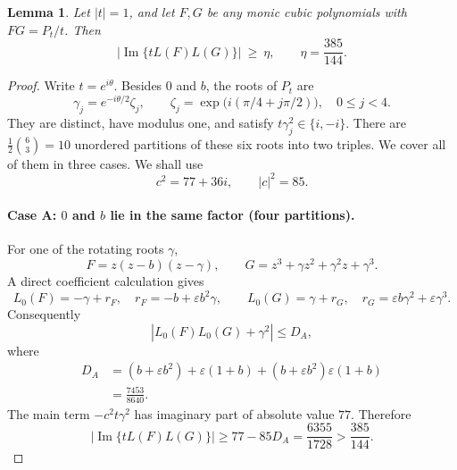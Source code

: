 \documentclass[11pt]{article}
\newtheorem{lemma}[theorem]{Lemma}
\theoremstyle{remark}\newtheorem{remark}[theorem]{Remark}
\newcommand{\im}{\operatorname{Im}}\newcommand{\re}{\operatorname{Re}}
\begin{document}
\begin{lemma}\label{lem:factor}
Let $|t|=1$, and let $F,G$ be any monic cubic polynomials with $FG=P_t/t$. Then
\begin{equation}\label{eq:margin}
 \bigl|\im\{tL(F)L(G)\}\bigr|\ \ge\ \eta,
 \qquad \eta=\frac{385}{144}.
\end{equation}
\end{lemma}
\begin{proof}
Write $t=e^{i\theta}$. Besides $0$ and $b$, the roots of $P_t$ are
\[
 \gamma_j=e^{-i\theta/2}\zeta_j,
 \qquad \zeta_j=\exp\bigl(i(\pi/4+j\pi/2)\bigr),\quad 0\le j<4.
\]
They are distinct, have modulus one, and satisfy $t\gamma_j^2\in\{i,-i\}$. There are $\frac12\binom63=10$ unordered partitions of these six roots into two triples. We cover all of them in three cases. We shall use
\[
 c^2=77+36i,\qquad |c|^2=85.
\]

\paragraph{Case A: $0$ and $b$ lie in the same factor (four partitions).}
For one of the rotating roots $\gamma$,
\[
 F=z(z-b)(z-\gamma),\qquad G=z^3+\gamma z^2+\gamma^2z+\gamma^3.
\]
A direct coefficient calculation gives
\[
 L_0(F)=-\gamma+r_F,\quad r_F=-b+\varepsilon b^2\gamma,
 \qquad L_0(G)=\gamma+r_G,\quad r_G=\varepsilon b\gamma^2+\varepsilon\gamma^3.
\]
Consequently
\[
 |L_0(F)L_0(G)+\gamma^2|\le D_A,
\]
where
\begin{align*}
 D_A&=(b+\varepsilon b^2)+\varepsilon(1+b)
       +(b+\varepsilon b^2)\varepsilon(1+b)\\
    &=\frac{7453}{8640}.
\end{align*}
The main term $-c^2t\gamma^2$ has imaginary part of absolute value $77$. Therefore
\[
 |\im\{tL(F)L(G)\}|\ge77-85D_A
   =\frac{6355}{1728}>\frac{385}{144}.
\]


\end{proof}
\end{document}
